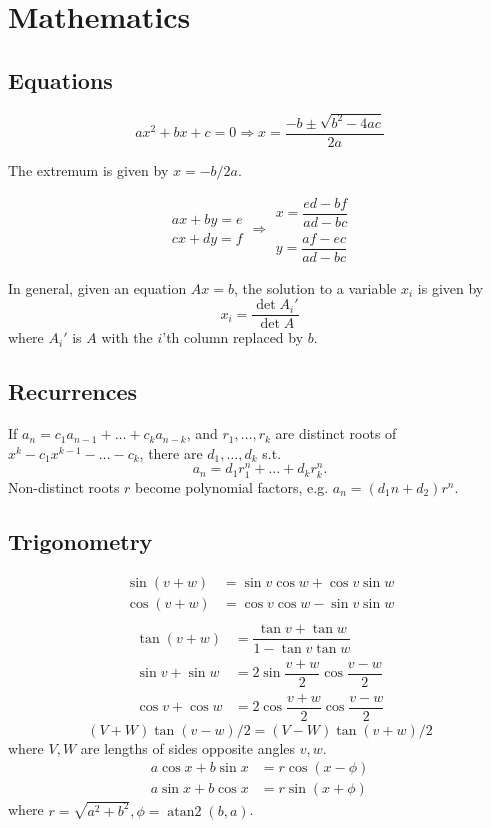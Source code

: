 
\chapter{Mathematics}

\section{Equations}
\[ax^2+bx+c=0 \Rightarrow x = \frac{-b\pm\sqrt{b^2-4ac}}{2a}\]

The extremum is given by $x = -b/2a$.

\[\begin{aligned}ax+by=e\\cx+dy=f\end{aligned}
\Rightarrow
\begin{aligned}x=\dfrac{ed-bf}{ad-bc}\\y=\dfrac{af-ec}{ad-bc}\end{aligned}\]

In general, given an equation $Ax = b$, the solution to a variable $x_i$ is given by
\[x_i = \frac{\det A_i'}{\det A} \]
where $A_i'$ is $A$ with the $i$'th column replaced by $b$.

\section{Recurrences}
If $a_n = c_1 a_{n-1} + \dots + c_k a_{n-k}$, and $r_1, \dots, r_k$ are distinct roots of $x^k - c_1 x^{k-1} - \dots - c_k$, there are $d_1, \dots, d_k$ s.t.
\[a_n = d_1r_1^n + \dots + d_kr_k^n. \]
Non-distinct roots $r$ become polynomial factors, e.g. $a_n = (d_1n + d_2)r^n$.

\section{Trigonometry}
\begin{align*}
\sin(v+w)&{}=\sin v\cos w+\cos v\sin w\\
\cos(v+w)&{}=\cos v\cos w-\sin v\sin w\\
\end{align*}
\begin{align*}
\tan(v+w)&{}=\dfrac{\tan v+\tan w}{1-\tan v\tan w}\\
\sin v+\sin w&{}=2\sin\dfrac{v+w}{2}\cos\dfrac{v-w}{2}\\
\cos v+\cos w&{}=2\cos\dfrac{v+w}{2}\cos\dfrac{v-w}{2}
\end{align*}
\[ (V+W)\tan(v-w)/2{}=(V-W)\tan(v+w)/2 \]
where $V, W$ are lengths of sides opposite angles $v, w$.
\begin{align*}
	a\cos x+b\sin x&=r\cos(x-\phi)\\
	a\sin x+b\cos x&=r\sin(x+\phi)
\end{align*}
where $r=\sqrt{a^2+b^2}, \phi=\operatorname{atan2}(b,a)$.

